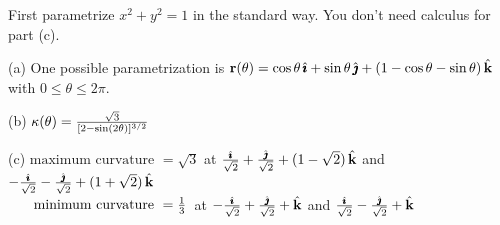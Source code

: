 \begin{hint} 
First parametrize $x^2+y^2=1$ in the standard way. You don't need calculus for part (c).
\end{hint}

\begin{answer} 
(a) One possible parametrization is 
$\mathbf{r}(\theta) = \cos\theta\,\hat{\pmb{\imath}} +\sin\theta\,\hat{\pmb{\jmath}} + (1-\cos\theta-\sin\theta)\,\hat{\mathbf{k}}$ with $0\le\theta\le 2\pi$.

(b) $\kappa(\theta)=\frac{\sqrt{3}}{[2-\sin(2\theta)]^{3/2}}$

(c) $\text{maximum curvature }=\sqrt{3}$
    at $\frac{\hat{\pmb{\imath}}}{\sqrt{2}}+\frac{\hat{\pmb{\jmath}}}{\sqrt{2}}+(1-\sqrt{2})\,\hat{\mathbf{k}}$
    and $-\frac{\hat{\pmb{\imath}}}{\sqrt{2}}-\frac{\hat{\pmb{\jmath}}}{\sqrt{2}}+(1 + \sqrt{2})\,\hat{\mathbf{k}}$\\
 $\text{\hskip0.25in minimum curvature }= \frac{1}{3}$\quad\ 
         at $-\frac{\hat{\pmb{\imath}}}{\sqrt{2}}+\frac{\hat{\pmb{\jmath}}}{\sqrt{2}}+\hat{\mathbf{k}}$
         and $\frac{\hat{\pmb{\imath}}}{\sqrt{2}}-\frac{\hat{\pmb{\jmath}}}{\sqrt{2}}+\hat{\mathbf{k}}$

\end{answer}

